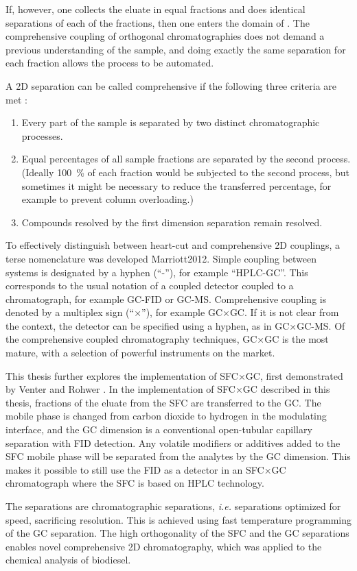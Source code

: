 If, however, one collects the eluate in equal fractions and does identical
separations of each of the fractions, then one enters the domain of
. The comprehensive coupling of
orthogonal chromatographies does not demand a previous understanding of the
sample, and doing exactly the same separation for each fraction allows the
process to be automated.

A 2D separation can be called comprehensive if the following three criteria are
met \autocite{Giddings1987}:

\begin{enumerate}
  
  \item Every part of the sample is separated by two distinct chromatographic
  processes.
  
  \item Equal percentages of all sample fractions are separated by the second
  process. (Ideally \SI{100}{\percent} of each fraction would be subjected to
  the second process, but sometimes it might be necessary to reduce the
  transferred percentage, for example to prevent column overloading.)
  
  \item Compounds resolved by the first dimension separation remain resolved.

\end{enumerate} 

To effectively distinguish between heart-cut and comprehensive 2D couplings, a
terse nomenclature was developed {Marriott2012}. Simple coupling between systems
is designated by a hyphen (``-''), for example ``HPLC-GC''. This corresponds to
the usual notation of a coupled detector coupled to a chromatograph, for example
GC-FID or GC-MS. Comprehensive coupling is denoted by a multiplex sign (``×''),
for example GC×GC. If it is not clear from the context, the detector can be
specified using a hyphen, as in GC×GC-MS. Of the comprehensive coupled
chromatography techniques, GC×GC is the most mature, with a selection of
powerful instruments on the market.

This thesis further explores the implementation of SFC×GC, first demonstrated by
Venter and Rohwer \autocite{Venter2004, Venter2006}. In the implementation of
SFC×GC described in this thesis, fractions of the eluate from the SFC are
transferred to the GC. The mobile phase is changed from carbon dioxide to
hydrogen in the modulating interface, and the GC dimension is a conventional
open-tubular capillary separation with FID detection. Any volatile modifiers or
additives added to the SFC mobile phase will be separated from the analytes by
the GC dimension. This makes it possible to still use the FID as a detector in
an SFC×GC chromatograph where the SFC is based on HPLC technology.

The \twoD separations are  chromatographic separations,
\textit{i.e.} separations optimized for speed, sacrificing resolution. This is
achieved using fast temperature programming of the GC separation. The high
orthogonality of the SFC and the GC separations enables novel comprehensive 2D
chromatography, which was applied to the chemical analysis of biodiesel.
